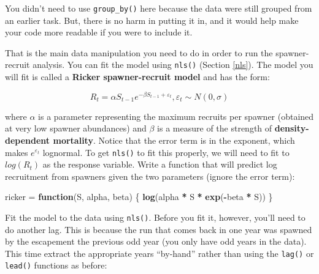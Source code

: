 \documentclass[]{book}
\newenvironment{Shaded}{\begin{snugshade}}{\end{snugshade}}
\newcommand{\KeywordTok}[1]{\textcolor[rgb]{0.13,0.29,0.53}{\textbf{#1}}}
\newcommand{\DecValTok}[1]{\textcolor[rgb]{0.00,0.00,0.81}{#1}}
\newcommand{\StringTok}[1]{\textcolor[rgb]{0.31,0.60,0.02}{#1}}
\newcommand{\CommentTok}[1]{\textcolor[rgb]{0.56,0.35,0.01}{\textit{#1}}}
\newcommand{\ControlFlowTok}[1]{\textcolor[rgb]{0.13,0.29,0.53}{\textbf{#1}}}
\newcommand{\OperatorTok}[1]{\textcolor[rgb]{0.81,0.36,0.00}{\textbf{#1}}}
\newcommand{\NormalTok}[1]{#1}
\theoremstyle{definition}
\theoremstyle{definition}
\theoremstyle{definition}
\theoremstyle{remark}
\begin{document}
You didn't need to use \texttt{group\_by()} here because the data were
still grouped from an earlier task. But, there is no harm in putting it
in, and it would help make your code more readable if you were to
include it.

That is the main data manipulation you need to do in order to run the
spawner-recruit analysis. You can fit the model using \texttt{nls()}
(Section \ref{nls}). The model you will fit is called a \textbf{Ricker
spawner-recruit model} and has the form:

\begin{equation}
  R_t = \alpha S_{t-1} e^{-\beta S_{t-1} + \varepsilon_t} ,\varepsilon_t \sim N(0,\sigma)
\label{eq:ricker-ch5}
\end{equation}

where \(\alpha\) is a parameter representing the maximum recruits per
spawner (obtained at very low spawner abundances) and \(\beta\) is a
measure of the strength of \textbf{density-dependent mortality}. Notice
that the error term is in the exponent, which makes
\(e^{\varepsilon_t}\) lognormal. To get \texttt{nls()} to fit this
properly, we will need to fit to \(log(R_t)\) as the response variable.
Write a function that will predict log recruitment from spawners given
the two parameters (ignore the error term):

\begin{Shaded}
\begin{Highlighting}[]
\NormalTok{ricker =}\StringTok{ }\ControlFlowTok{function}\NormalTok{(S, alpha, beta) \{}
  \KeywordTok{log}\NormalTok{(alpha }\OperatorTok{*}\StringTok{ }\NormalTok{S }\OperatorTok{*}\StringTok{ }\KeywordTok{exp}\NormalTok{(}\OperatorTok{-}\NormalTok{beta }\OperatorTok{*}\StringTok{ }\NormalTok{S))}
\NormalTok{\}}
\end{Highlighting}
\end{Shaded}

Fit the model to the data using \texttt{nls()}. Before you fit it,
however, you'll need to do another lag. This is because the run that
comes back in one year was spawned by the escapement the previous odd
year (you only have odd years in the data). This time extract the
appropriate years ``by-hand'' rather than using the \texttt{lag()} or
\texttt{lead()} functions as before:

\begin{Shaded}
\end{Shaded}
\end{document}
